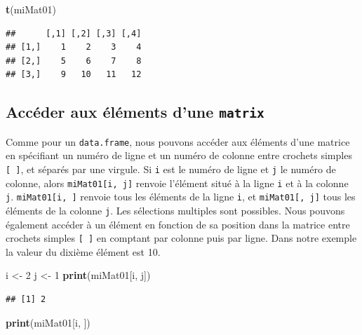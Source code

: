 \documentclass[
]{book}
\newenvironment{Shaded}{\begin{snugshade}}{\end{snugshade}}
\newcommand{\DecValTok}[1]{\textcolor[rgb]{0.00,0.00,0.81}{#1}}
\newcommand{\KeywordTok}[1]{\textcolor[rgb]{0.13,0.29,0.53}{\textbf{#1}}}
\newcommand{\NormalTok}[1]{#1}
\newcommand{\StringTok}[1]{\textcolor[rgb]{0.31,0.60,0.02}{#1}}
\begin{document}
\begin{Shaded}
\begin{Highlighting}[]
\KeywordTok{t}\NormalTok{(miMat01)}
\end{Highlighting}
\end{Shaded}

\begin{verbatim}
##      [,1] [,2] [,3] [,4]
## [1,]    1    2    3    4
## [2,]    5    6    7    8
## [3,]    9   10   11   12
\end{verbatim}

\hypertarget{accuxe9der-aux-uxe9luxe9ments-dune-matrix}{%
\subsection{\texorpdfstring{Accéder aux éléments d'une \texttt{matrix}}{Accéder aux éléments d'une matrix}}\label{accuxe9der-aux-uxe9luxe9ments-dune-matrix}}

Comme pour un \texttt{data.frame}, nous pouvons accéder aux éléments d'une matrice en spécifiant un numéro de ligne et un numéro de colonne entre crochets simples \texttt{{[}\ {]}}, et séparés par une virgule. Si \texttt{i} est le numéro de ligne et \texttt{j} le numéro de colonne, alors \texttt{miMat01{[}i,\ j{]}} renvoie l'élément situé à la ligne \texttt{i} et à la colonne \texttt{j}. \texttt{miMat01{[}i,\ {]}} renvoie tous les éléments de la ligne \texttt{i}, et \texttt{miMat01{[},\ j{]}} tous les éléments de la colonne \texttt{j}. Les sélections multiples sont possibles. Nous pouvons également accéder à un élément en fonction de sa position dans la matrice entre crochets simples \texttt{{[}\ {]}} en comptant par colonne puis par ligne. Dans notre exemple la valeur du dixième élément est 10.

\begin{Shaded}
\begin{Highlighting}[]
\NormalTok{i <-}\StringTok{ }\DecValTok{2}
\NormalTok{j <-}\StringTok{ }\DecValTok{1}
\KeywordTok{print}\NormalTok{(miMat01[i, j])}
\end{Highlighting}
\end{Shaded}

\begin{verbatim}
## [1] 2
\end{verbatim}

\begin{Shaded}
\begin{Highlighting}[]
\KeywordTok{print}\NormalTok{(miMat01[i, ])}
\end{Highlighting}
\end{Shaded}
\end{document}
